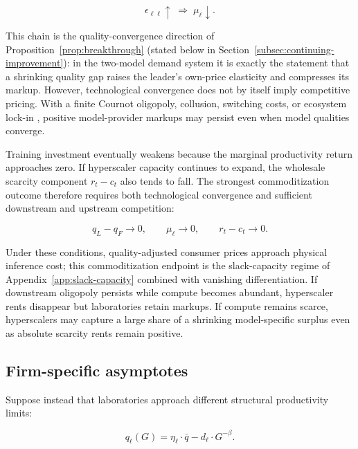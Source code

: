 \documentclass[11pt]{article}
\begin{document}
\begin{equation}\epsilon_{\ell\ell}\uparrow\;\Longrightarrow\;\mu_\ell\downarrow.\end{equation}

This chain is the quality-convergence direction of Proposition~\ref{prop:breakthrough} (stated below in Section~\ref{subsec:continuing-improvement}): in the two-model demand system it is exactly the statement that a shrinking quality gap raises the leader's own-price elasticity and compresses its markup. However, technological convergence does not by itself imply competitive pricing. With a finite Cournot oligopoly, collusion, switching costs, or ecosystem lock-in \citep{klemperer1995}, positive model-provider markups may persist even when model qualities converge.

Training investment eventually weakens because the marginal productivity return approaches zero. If hyperscaler capacity continues to expand, the wholesale scarcity component $r_t-c_t$ also tends to fall. The strongest commoditization outcome therefore requires both technological convergence and sufficient downstream and upstream competition:

\begin{equation}q_L-q_F\rightarrow0,\qquad \mu_\ell\rightarrow0,\qquad r_t-c_t\rightarrow0.\end{equation}

Under these conditions, quality-adjusted consumer prices approach physical inference cost; this commoditization endpoint is the slack-capacity regime of Appendix~\ref{app:slack-capacity} combined with vanishing differentiation. If downstream oligopoly persists while compute becomes abundant, hyperscaler rents disappear but laboratories retain markups. If compute remains scarce, hyperscalers may capture a large share of a shrinking model-specific surplus even as absolute scarcity rents remain positive.

\subsection{Firm-specific asymptotes}
\label{subsec:firm-specific-asymptotes}

Suppose instead that laboratories approach different structural productivity limits:

\begin{equation}q_\ell(G)=\eta_\ell\cdot\bar q-d_\ell\cdot G^{-\beta}.\end{equation}
\end{document}

